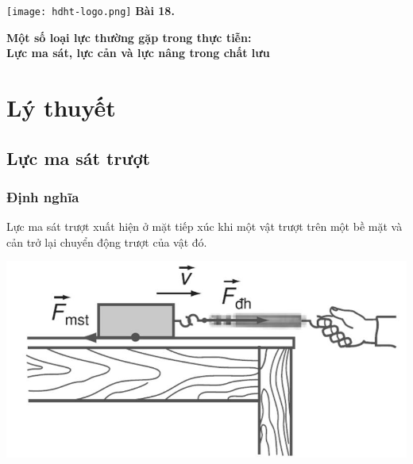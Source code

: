 \newcommand{\chapter}[2][]{
	\newcommand{\chapname}{#2}
	\begin{flushleft}
		\begin{minipage}[t]{\linewidth}
			\texttt{[image: hdht-logo.png]}
			\hspace{0pt}	
			\sffamily\bfseries\large Bài  18.
			\begin{flushleft}
				\LARGE\bfseries #1
			\end{flushleft}
		\end{minipage}
	\end{flushleft}
	\vspace{1cm}
	\normalfont\normalsize
}
\chapter[Một số loại lực thường gặp trong thực tiễn:\\ Lực ma sát, lực cản và lực nâng trong chất lưu]{Một số loại lực thường gặp trong thực tiễn: \\Lực ma sát, lực cản và lực nâng trong chất lưu}
\section{Lý thuyết}

\subsection{Lực ma sát trượt}
\subsubsection{Định nghĩa}
Lực ma sát trượt xuất hiện ở mặt tiếp xúc khi một vật trượt trên một bề mặt và cản trở lại chuyển động trượt của vật đó.
\begin{center}
	\includegraphics[scale=0.35]{../figs/VN10-PH-15-L-012-1-V2-01.JPG}
\end{center}
